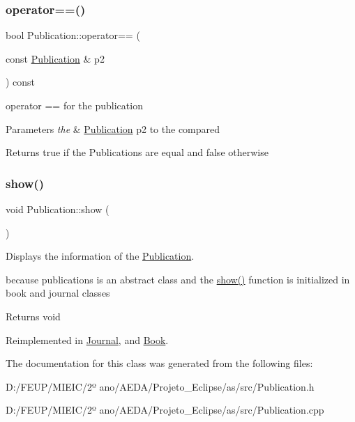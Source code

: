 \mbox{\label{class_publication_a60f079ac47aa4b8aa94957e15f12a2da}} 
\subsubsection{\texorpdfstring{operator==()}{operator==()}}
{\footnotesize\ttfamily bool Publication\+::operator== (\begin{DoxyParamCaption}\item[{const \hyperlink{class_publication}{Publication} \&}]{p2 }\end{DoxyParamCaption}) const}



operator == for the publication 


\begin{DoxyParams}{Parameters}
{\em the} & \hyperlink{class_publication}{Publication} p2 to the compared\\
\hline
\end{DoxyParams}
\begin{DoxyReturn}{Returns}
true if the Publications are equal and false otherwise 
\end{DoxyReturn}
\mbox{\label{class_publication_aa4240a04fcecd6257e0d1a33e8f18ff0}} 
\subsubsection{\texorpdfstring{show()}{show()}}
{\footnotesize\ttfamily void Publication\+::show (\begin{DoxyParamCaption}{ }\end{DoxyParamCaption})\hspace{0.3cm}{\ttfamily [virtual]}}



Displays the information of the \hyperlink{class_publication}{Publication}. 

because publications is an abstract class and the \hyperlink{class_publication_aa4240a04fcecd6257e0d1a33e8f18ff0}{show()} function is initialized in book and journal classes

\begin{DoxyReturn}{Returns}
void 
\end{DoxyReturn}


Reimplemented in \hyperlink{class_journal_a7131809f3865fbdcbba5f38996d29c7a}{Journal}, and \hyperlink{class_book_a8368f243d8a645444e8019760a50cc8b}{Book}.



The documentation for this class was generated from the following files\+:\begin{DoxyCompactItemize}
\item 
D\+:/\+F\+E\+U\+P/\+M\+I\+E\+I\+C/2º ano/\+A\+E\+D\+A/\+Projeto\+\_\+\+Eclipse/as/src/Publication.\+h\item 
D\+:/\+F\+E\+U\+P/\+M\+I\+E\+I\+C/2º ano/\+A\+E\+D\+A/\+Projeto\+\_\+\+Eclipse/as/src/Publication.\+cpp\end{DoxyCompactItemize}
